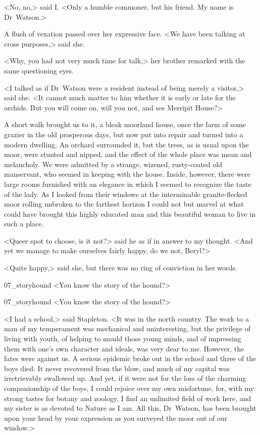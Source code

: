 <No, no,> said I\@. <Only a humble commoner, but his friend. My name is Dr~Watson.>

A flush of vexation passed over her expressive face. <We have been talking at cross purposes,> said she.

<Why, you had not very much time for talk,> her brother remarked with the same questioning eyes.

<I talked as if Dr~Watson were a resident instead of being merely a visitor,> said she. <It cannot much matter to him whether it is early or late for the orchids. But you will come on, will you not, and see Merripit House?>



A short walk brought us to it, a bleak moorland house, once the farm of some grazier in the old prosperous days, but now put into repair and turned into a modern dwelling. An orchard surrounded it, but the trees, as is usual upon the moor, were stunted and nipped, and the effect of the whole place was mean and melancholy. We were admitted by a strange, wizened, rusty-coated old manservant, who seemed in keeping with the house. Inside, however, there were large rooms furnished with an elegance in which I seemed to recognize the taste of the lady. As I looked from their windows at the interminable granite-flecked moor rolling unbroken to the farthest horizon I could not but marvel at what could have brought this highly educated man and this beautiful woman to live in such a place.

<Queer spot to choose, is it not?> said he as if in answer to my thought. <And yet we manage to make ourselves fairly happy, do we not, Beryl?>

<Quite happy,> said she, but there was no ring of conviction in her words.

\begin{letter}
	\begin{bwbigpic}
			[1.0] 
		{07_storyhound}
		{<You know the story of the hound?>}
	\end{bwbigpic}
\end{letter}
\begin{a4}
	\begin{bwbigpic}
			[1.0]  
		{07_storyhound}
		{<You know the story of the hound?>}
	\end{bwbigpic}
\end{a4}

<I had a school,> said Stapleton. <It was in the north country. The work to a man of my temperament was mechanical and uninteresting, but the privilege of living with youth, of helping to mould those young minds, and of impressing them with one's own character and ideals, was very dear to me. However, the fates were against us. A serious epidemic broke out in the school and three of the boys died. It never recovered from the blow, and much of my capital was irretrievably swallowed up. And yet, if it were not for the loss of the charming companionship of the boys, I could rejoice over my own misfortune, for, with my strong tastes for botany and zoology, I find an unlimited field of work here, and my sister is as devoted to Nature as I am. All this, Dr~Watson, has been brought upon your head by your expression as you surveyed the moor out of our window.>

